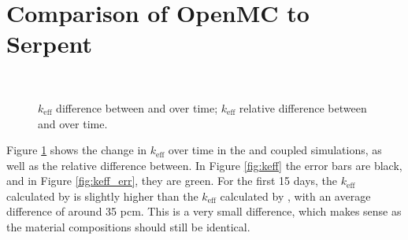 \section{Comparison of OpenMC to Serpent}
\label{sec:openmc-vs-serpent}

\begin{figure}[htpb]
    \centering
    \\
    \caption[$k_\text{eff}$ difference between \OpenMC and \SerpentTWO over time]{
         $k_\text{eff}$ difference between \OpenMC and \SerpentTWO over time;
         $k_\text{eff}$ relative difference between \OpenMC and \SerpentTWO 
        over time.
    }
    \label{fig:keff_sum}
\end{figure}

Figure \ref{fig:keff_sum} shows the change in $k_\text{eff}$ over time in the \OpenMC and \SerpentTWO
coupled simulations, as well as the relative difference between.
In Figure \ref{fig:keff} the error bars are black, and in Figure
\ref{fig:keff_err}, they are green. For the first 15 days, the
$k_\text{eff}$ calculated by \OpenMC is slightly  higher than the 
$k_\text{eff}$ calculated by \SerpentTWO, with an average difference of around 35 pcm.
This is a very small difference, which makes sense as the material compositions should still
be identical.

